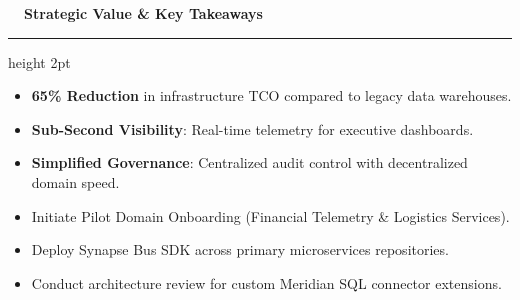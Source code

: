 \documentclass[landscape]{slides}
\newcommand{\slidetitle}[1]{%
  {\Large\bfseries\color{NavyDark} #1}\par\vspace{0.3em}%
  {\color{TealAccent}\hrule height 2pt}\vspace{0.6em}%
}
\begin{document}
\begin{slide}
\slidetitle{\faCheckCircle~~Strategic Value \& Key Takeaways}

\begin{minipage}[t]{0.48\textwidth}
  \begin{tcolorbox}[colback=CardBg,colframe=TealAccent,title=\textbf{\faChartLine~~Business ROI \& Operational Value}]
    \small
    \begin{itemize}
      \item \textbf{65\% Reduction} in infrastructure TCO compared to legacy data warehouses.
      \item \textbf{Sub-Second Visibility}: Real-time telemetry for executive dashboards.
      \item \textbf{Simplified Governance}: Centralized audit control with decentralized domain speed.
    \end{itemize}
  \end{tcolorbox}
\end{minipage}%
\hfill
\begin{minipage}[t]{0.48\textwidth}
  \begin{tcolorbox}[colback=CardBg,colframe=NavyDark,title=\textbf{\faTerminal~~Next Steps for Engineering Teams}]
    \small
    \begin{itemize}
      \item Initiate Pilot Domain Onboarding (Financial Telemetry \& Logistics Services).
      \item Deploy Synapse Bus SDK across primary microservices repositories.
      \item Conduct architecture review for custom Meridian SQL connector extensions.
    \end{itemize}
  \end{tcolorbox}
\end{minipage}
\end{slide}
\end{document}
